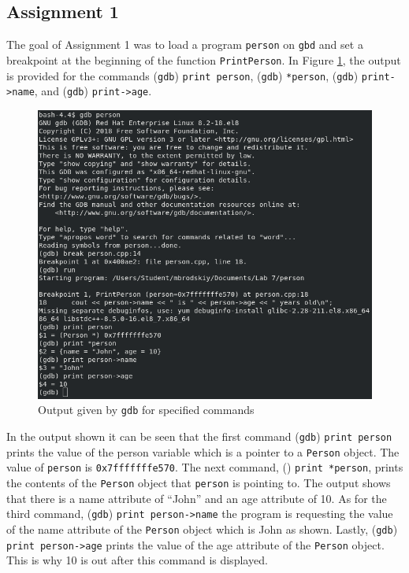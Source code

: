 \documentclass[
	letterpaper, %
	10pt, %
]{CSUniSchoolLabReport}
\begin{document}
\subsection{Assignment 1}

The goal of Assignment 1 was to load a program \texttt{person} on \texttt{gbd} and set a breakpoint at the beginning of the function \texttt{PrintPerson}. In Figure \ref{fig:3}, the output is provided for the commands (\texttt{gdb}) \texttt{print person}, (\texttt{gdb}) \texttt{*person}, (\texttt{gdb}) \texttt{print->name}, and (\texttt{gdb}) \texttt{print->age}.

\begin{figure}[H]
  \centering
  \includegraphics[width=.9\textwidth]{Figures/Assign1.png}
  \caption{Output given by \texttt{gdb} for specified commands}
  \label{fig:3}
\end{figure}

In the output shown it can be seen that the first command (\texttt{gdb}) \texttt{print person} prints the value of the person variable which is a pointer to a \texttt{Person} object. The value of \texttt{person} is \texttt{0x7fffffffe570}. The next command, () \texttt{print *person}, prints the contents of the \texttt{Person} object that \texttt{person} is pointing to. The output shows that there is a name attribute of “John” and an age attribute of 10. As for the third command, (\texttt{gdb}) \texttt{print person->name} the program is requesting the value of the name attribute of the \texttt{Person} object which is John as shown. Lastly, (\texttt{gdb}) \texttt{print person->age} prints the value of the age attribute of the \texttt{Person} object. This is why 10 is out after this command is displayed. 
\end{document}
